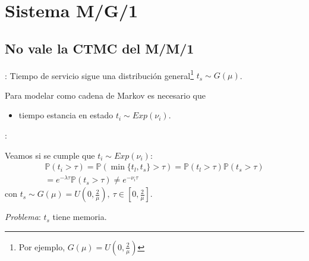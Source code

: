 \documentclass[xcolor={x11names}]{beamer}
\begin{document}
\section{Sistema M/G/1}
\subsection{No vale la CTMC del M/M/1}
\begin{frame}{\secname: \subsecname}
    Tiempo de servicio sigue una distribución
    general\footnote{Por ejemplo,
    $G(\mu)=U(0,\tfrac{2}{\mu})$}
    $t_s\sim G(\mu)$.

    \begin{figure}
        
    \end{figure}

    \vfill
    Para modelar como cadena de Markov
    es necesario que
    \begin{itemize}
        \item tiempo estancia en estado
            $t_i\sim Exp(\nu_i)$.
    \end{itemize}
\end{frame}



\begin{frame}{\secname: \subsecname}
    \begin{figure}
        
    \end{figure}

    \vfill
    Veamos si se cumple que $t_i\sim Exp(\nu_i)$:
    \begin{multline}
        \mathbb{P}(t_i>\tau) =
        \mathbb{P}(\min\{t_l,t_s\}>\tau)=
        \mathbb{P}(t_l>\tau)
        \mathbb{P}(t_s>\tau)\\
        = 
        e^{-\lambda\tau} \mathbb{P}(t_s>\tau) \neq e^{-\nu_i \tau}
    \end{multline}
    con $t_s\sim G(\mu)=U\left(0,\tfrac{2}{\mu}\right),\
    \tau\in\left[0,\tfrac{2}{\mu}\right]$.

    \emph{Problema}: $t_s$ tiene memoria.
\end{frame}
\end{document}

